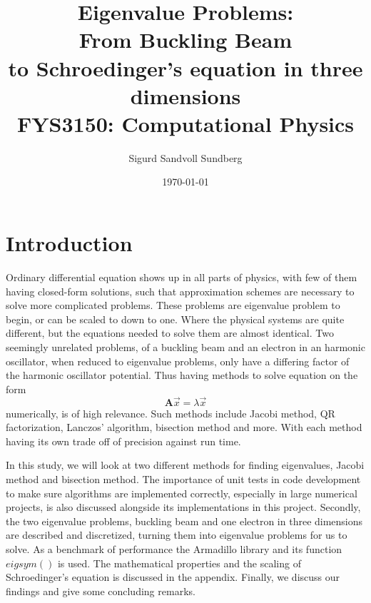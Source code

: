 \documentclass[%
reprint,
nofootinbib,
amsmath,amssymb,
aps,
]{revtex4-1}
\begin{document}
	
\title{Eigenvalue Problems: \\
	\normalsize{From Buckling Beam\\
		to Schroedinger's equation in three dimensions} \\
	\hrulefill\small{ FYS3150: Computational Physics }\hrulefill}

\author{Sigurd Sandvoll Sundberg}

%

\date{\today}

\begin{abstract}%

\end{abstract}

\maketitle 

\section{Introduction}%
Ordinary differential equation shows up in all parts of physics, with few of them having closed-form solutions, such that approximation schemes are necessary to solve more complicated problems.  These problems are eigenvalue problem to begin, or can be scaled to down to one. Where the physical systems are quite different, but the equations needed to solve them are almost identical. Two seemingly unrelated problems, of a buckling beam and an electron in an harmonic oscillator, when reduced to eigenvalue problems, only have a differing factor of the harmonic oscillator potential. Thus having methods to solve equation on the form 
\begin{equation}
	\mathbf{A} \vec{x} = \lambda \vec{x}
\end{equation}
numerically, is of high relevance. Such methods include Jacobi method, QR factorization, Lanczos' algorithm, bisection method and more. With each method having its own trade off of precision against run time. 

In this study, we will look at two different methods for finding eigenvalues, Jacobi method\cite{GoluVanlJM} and bisection method\cite{barth1967calculation}. The importance of unit tests in code development to make sure algorithms are implemented correctly, especially in large numerical projects, is also discussed alongside its implementations in this project. Secondly, the two eigenvalue problems, buckling beam and one electron in three dimensions are described and discretized, turning them into eigenvalue problems for us to solve. As a benchmark of performance  the Armadillo library and its function $eigsym()$ is used. The mathematical properties and the scaling of Schroedinger's equation is discussed in the appendix. Finally, we discuss our findings and give some concluding remarks.
\end{document}
